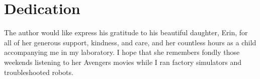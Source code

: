 \chapter*{Dedication}
The author would like express his gratitude to his beautiful daughter, Erin, for all of her
generous support, kindness, and care, and her countless hours as a child accompanying me in my laboratory. I hope that she
remembers fondly those weekends listening to her Avengers movies while I ran factory simulators and troubleshooted robots.
